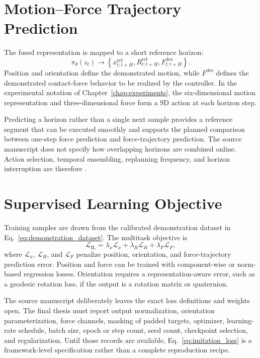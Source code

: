 \section{Motion--Force Trajectory Prediction}
The fused representation is mapped to a short reference horizon:
\begin{equation}
  \pi_\theta(z_t)\rightarrow
  \left\{
    x^{\mathrm{ref}}_{t:t+H},
    R^{\mathrm{ref}}_{t:t+H},
    F^{\mathrm{des}}_{t:t+H}
  \right\}.
  \label{eq:motion_force_prediction}
\end{equation}
Position and orientation define the demonstrated motion, while \(F^{\mathrm{des}}\) defines the demonstrated contact-force behavior to be realized by the controller. In the experimental notation of Chapter~\ref{chap:experiments}, the six-dimensional motion representation and three-dimensional force form a 9D action at each horizon step.

Predicting a horizon rather than a single next sample provides a reference segment that can be executed smoothly and supports the planned comparison between one-step force prediction and force-trajectory prediction. The source manuscript does not specify how overlapping horizons are combined online. Action selection, temporal ensembling, replanning frequency, and horizon interruption are therefore .

\section{Supervised Learning Objective}
Training samples are drawn from the calibrated demonstration dataset in Eq.~\eqref{eq:demonstration_dataset}. The multitask objective is
\begin{equation}
  \mathcal{L}_{\mathrm{IL}}
  =\lambda_x\mathcal{L}_x
  +\lambda_R\mathcal{L}_R
  +\lambda_F\mathcal{L}_F,
  \label{eq:imitation_loss}
\end{equation}
where \(\mathcal{L}_x\), \(\mathcal{L}_R\), and \(\mathcal{L}_F\) penalize position, orientation, and force-trajectory prediction error. Position and force can be trained with component-wise or norm-based regression losses. Orientation requires a representation-aware error, such as a geodesic rotation loss, if the output is a rotation matrix or quaternion.

The source manuscript deliberately leaves the exact loss definitions and weights open. The final thesis must report output normalization, orientation parameterization, force channels, masking of padded targets, optimizer, learning-rate schedule, batch size, epoch or step count, seed count, checkpoint selection, and regularization. Until those records are available, Eq.~\eqref{eq:imitation_loss} is a framework-level specification rather than a complete reproduction recipe.

